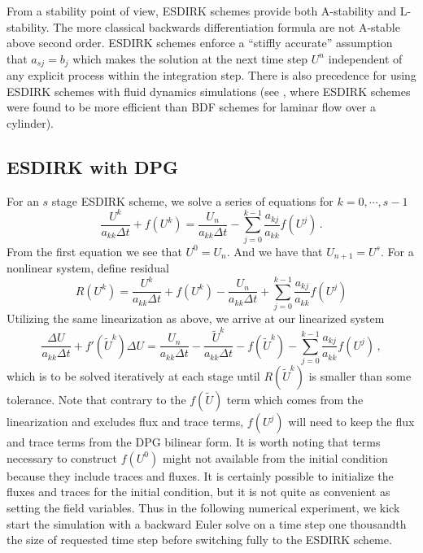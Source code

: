 \documentclass[Proposal.tex]{subfiles}
\begin{document}
From a stability point of view, ESDIRK schemes provide both A-stability and L-stability. 
The more classical backwards differentiation formula are not A-stable above second order.
ESDIRK schemes enforce a ``stiffly accurate'' assumption that $a_{sj}=b_j$ which makes the solution at the next time step $U^n$ independent of any explicit process within the integration step.
There is also precedence for using ESDIRK schemes with fluid dynamics simulations (see \cite{Bijl2002}, where ESDIRK schemes were found to be more efficient than BDF schemes for laminar flow over a cylinder).

\subsection{ESDIRK with DPG}
For an $s$ stage ESDIRK scheme, we solve a series of equations for $k=0,\cdots,s-1$
\begin{equation*}
\frac{U^k}{a_{kk}\Delta t}+f(U^k)=\frac{U_n}{a_{kk}\Delta
t}-\sum_{j=0}^{k-1}\frac{a_{kj}}{a_{kk}}f(U^j)\,.
\end{equation*}
From the first equation we see that $U^0=U_n$. And we have that $U_{n+1}=U^s$.
For a nonlinear system, define residual
\[
R(U^k) =
\frac{U^k}{a_{kk}\Delta t}+f(U^k)-\frac{U_n}{a_{kk}\Delta
t}+\sum_{j=0}^{k-1}\frac{a_{kj}}{a_{kk}}f(U^j)
\]
Utilizing the same linearization as above, we arrive at our linearized system
\begin{equation}
	\label{eq:ESDIRKScheme}
	\frac{\Delta U}{a_{kk}\Delta t}+f'(\tilde U^k)\Delta U
	=\frac{U_n}{a_{kk}\Delta t}-\frac{\tilde U^k}{a_{kk}\Delta t}-f(\tilde U^k)
	-\sum_{j=0}^{k-1}\frac{a_{kj}}{a_{kk}}f(U^j)\,,
	\end{equation}
which is to be solved iteratively at each stage until $R(\tilde U^k)$ is smaller than some tolerance.
Note that contrary to the $f(\tilde U)$ term which comes from the linearization and excludes flux and trace terms,
$f(U^j)$ will need to keep the flux and trace terms from the DPG bilinear form.
It is worth noting that terms necessary to construct $f(U^0)$ might not available from the initial condition because they include traces and fluxes.
It is certainly possible to initialize the fluxes and traces for the initial condition, but it is not quite as convenient as setting the field variables.
Thus in the following numerical experiment, we kick start the simulation with a backward Euler solve on a time step one thousandth the size of requested time step before switching fully to the ESDIRK scheme.
\end{document}
